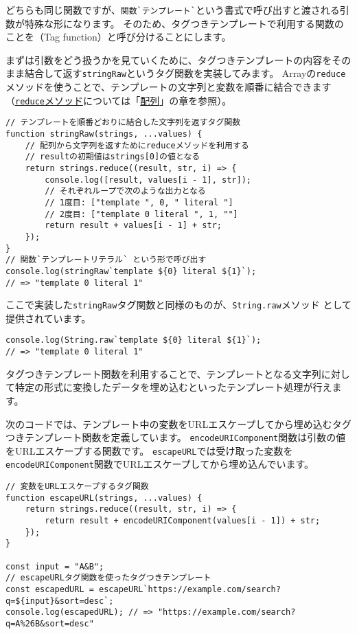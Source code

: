 どちらも同じ関数ですが、\texttt{関数}\lstinline{`}\texttt{テンプレート}\lstinline{`}という書式で呼び出すと渡される引数が特殊な形になります。
そのため、タグつきテンプレートで利用する関数のことを\textbf{}（Tag
function）と呼び分けることにします。

まずは引数をどう扱うかを見ていくために、タグつきテンプレートの内容をそのまま結合して返す\texttt{stringRaw}というタグ関数を実装してみます。
Arrayの\texttt{reduce}メソッドを使うことで、テンプレートの文字列と変数を順番に結合できます（\hyperlink{array-reduce}{\texttt{reduce}メソッド}については「\hyperlink{array}{配列}」の章を参照）。

\begin{lstlisting}
// テンプレートを順番どおりに結合した文字列を返すタグ関数
function stringRaw(strings, ...values) {
    // 配列から文字列を返すためにreduceメソッドを利用する
    // resultの初期値はstrings[0]の値となる
    return strings.reduce((result, str, i) => {
        console.log([result, values[i - 1], str]);
        // それぞれループで次のような出力となる
        // 1度目: ["template ", 0, " literal "]
        // 2度目: ["template 0 literal ", 1, ""]
        return result + values[i - 1] + str;
    });
}
// 関数`テンプレートリテラル` という形で呼び出す
console.log(stringRaw`template ${0} literal ${1}`); 
// => "template 0 literal 1"
\end{lstlisting}
\newpage
ここで実装した\texttt{stringRaw}タグ関数と同様のものが、\texttt{String.raw}メソッド\,\protect{}\,として提供されています。

\begin{lstlisting}
console.log(String.raw`template ${0} literal ${1}`); 
// => "template 0 literal 1"
\end{lstlisting}

タグつきテンプレート関数を利用することで、テンプレートとなる文字列に対して特定の形式に変換したデータを埋め込むといったテンプレート処理が行えます。

次のコードでは、テンプレート中の変数をURLエスケープしてから埋め込むタグつきテンプレート関数を定義しています。
\texttt{encodeURIComponent}関数は引数の値をURLエスケープする関数です。
\texttt{escapeURL}では受け取った変数を\texttt{encodeURIComponent}関数でURLエスケープしてから埋め込んでいます。

\begin{lstlisting}
// 変数をURLエスケープするタグ関数
function escapeURL(strings, ...values) {
    return strings.reduce((result, str, i) => {
        return result + encodeURIComponent(values[i - 1]) + str;
    });
}

const input = "A&B";
// escapeURLタグ関数を使ったタグつきテンプレート
const escapedURL = escapeURL`https://example.com/search?q=${input}&sort=desc`;
console.log(escapedURL); // => "https://example.com/search?q=A%26B&sort=desc"
\end{lstlisting}

